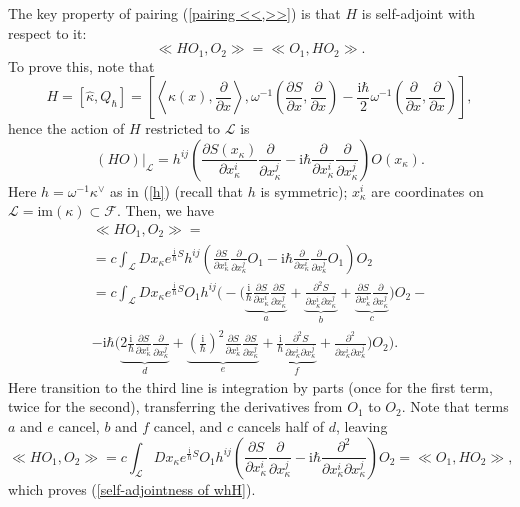 \documentclass{amsart}
\theoremstyle{plain} %
\theoremstyle{definition}
\theoremstyle{remark}
\newcommand{\mr}{\mathrm}
\newcommand{\wh}{\widehat}
\newcommand{\F}{\mathcal{F}}
\newcommand{\LL}{\mathcal{L}}
\newcommand{\dd}{\partial}
\newcommand{\iii}{\mathrm{i}}
\begin{document}
The key property of pairing (\ref{pairing <<,>>}) is that $H$ is self-adjoint with respect to it:
\begin{equation}\label{self-adjointness of whH}
    \ll HO_1,O_2 \gg = \ll O_1,H O_2 \gg.
\end{equation}
To prove this, note that
\begin{equation}
    H=[\wh\kappa,Q_\hbar]= \left[\left\langle \kappa(x),\frac{\dd}{\dd x} \right\rangle, \omega^{-1}\left(\frac{\dd S}{\dd x},\frac{\dd}{\dd x}\right)-\frac{\iii\hbar}{2}\omega^{-1}\left(\frac{\dd}{\dd x},\frac{\dd}{\dd x}\right)\right],
\end{equation}
hence the action of $H$ restricted to $\LL$ is
\begin{equation}
    (HO)|_\LL= h^{ij}\left(\frac{\dd S(x_\kappa)}{\dd x^i_\kappa} \frac{\dd}{\dd x^j_\kappa} - \iii\hbar  \frac{\dd}{\dd x^i_\kappa}\frac{\dd}{\dd x^j_\kappa}\right) O(x_\kappa).
\end{equation}
Here $h=\omega^{-1}\kappa^\vee$ as in (\ref{h}) (recall that $h$ is symmetric); %
$x_\kappa^i$ are coordinates on $\LL=\mr{im}(\kappa)\subset \F$. Then, we have
\begin{multline}\label{self-adjointness of whH eq1}
    \ll HO_1,O_2\gg =\\
    = c\int_\LL Dx_\kappa e^{\frac{\iii}{\hbar}S%
    } h^{ij}\left(
    \frac{\dd S%
    }{\dd x^i_\kappa} \frac{\dd }{\dd x^j_\kappa}O_1%
    -\iii\hbar \frac{\dd}{\dd x_\kappa^i}\frac{\dd}{\dd x_\kappa^j} O_1
    \right) O_2%
    \\
    =c\int_\LL Dx_\kappa e^{\frac{\iii}{\hbar}S}O_1 h^{ij}\Big(
    -\Big(\underbrace{\frac{\iii}{\hbar}\frac{\dd S}{\dd x^i_\kappa}\frac{\dd S}{\dd x^j_\kappa}}_a+\underbrace{\frac{\dd^2 S}{\dd x^i_\kappa \dd x^j_\kappa}}_b+\underbrace{\frac{\dd S}{\dd x^i_\kappa}\frac{\dd}{\dd x^j_\kappa}}_c\Big)O_2-\\
    -\iii\hbar\Big(
    \underbrace{2\frac{\iii}{\hbar}\frac{\dd S}{\dd x^i_\kappa}\frac{\dd}{\dd x^j_\kappa}}_d+\underbrace{\left(\frac{\iii}{\hbar}\right)^2 \frac{\dd S}{\dd x^i_\kappa}\frac{\dd S}{\dd x^j_\kappa}}_e+\underbrace{\frac{\iii}{\hbar}\frac{\dd^2 S}{\dd x^i_\kappa \dd x^j_\kappa}}_f+\frac{\dd^2}{\dd x^i_\kappa \dd x^j_\kappa}
    \Big) O_2
    \Big).
\end{multline}
Here transition to the third line is integration by parts (once for the first term, twice for the second), transferring the derivatives from $O_1$ to $O_2$. Note that terms $a$ and $e$ cancel, $b$ and $f$ cancel, and $c$ cancels half of $d$, leaving
\begin{equation}\label{self-adjointness of whH eq2}
    \ll HO_1,O_2 \gg = c\int_\LL Dx_\kappa e^{\frac{\iii}{\hbar}S} O_1 h^{ij}\left(\frac{\dd S}{\dd x^i_\kappa} \frac{\dd}{\dd x^j_\kappa}-\iii\hbar \frac{\dd^2}{\dd x^i_\kappa \dd x^j_\kappa}\right)O_2
    = \ll O_1,HO_2 \gg,
\end{equation}
which proves (\ref{self-adjointness of whH}).
\end{document}
